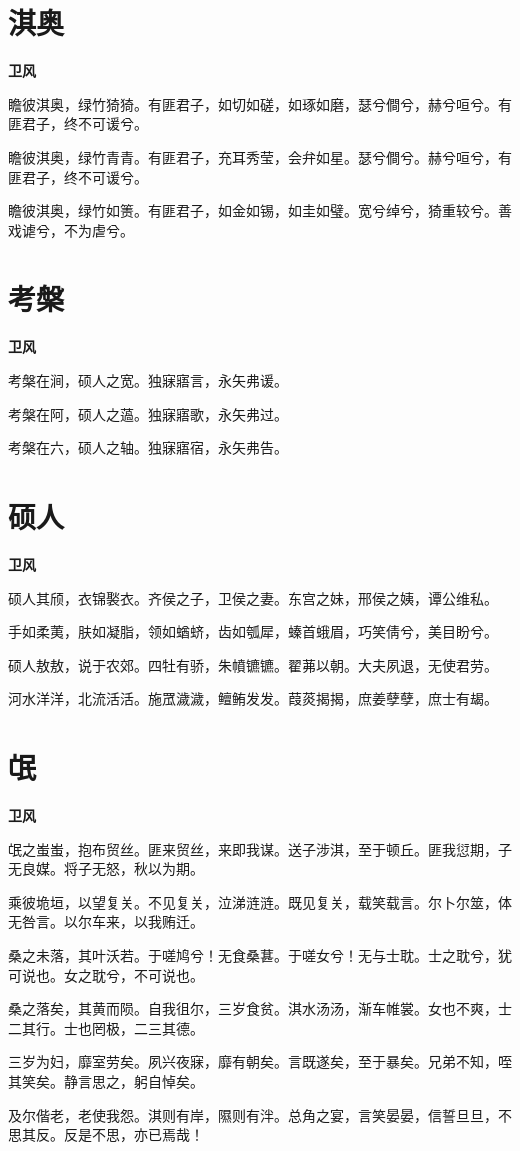 \documentclass[12pt,a4paper]{ctexbook}
\begin{document}
\section{淇奥}
\textbf{卫风}\par\vspace{0.5em}
瞻彼淇奥，绿竹猗猗。有匪君子，如切如磋，如琢如磨，瑟兮僴兮，赫兮咺兮。有匪君子，终不可谖兮。\par
瞻彼淇奥，绿竹青青。有匪君子，充耳秀莹，会弁如星。瑟兮僴兮。赫兮咺兮，有匪君子，终不可谖兮。\par
瞻彼淇奥，绿竹如箦。有匪君子，如金如锡，如圭如璧。宽兮绰兮，猗重较兮。善戏谑兮，不为虐兮。\par

\section{考槃}
\textbf{卫风}\par\vspace{0.5em}
考槃在涧，硕人之宽。独寐寤言，永矢弗谖。\par
考槃在阿，硕人之薖。独寐寤歌，永矢弗过。\par
考槃在六，硕人之轴。独寐寤宿，永矢弗告。\par

\section{硕人}
\textbf{卫风}\par\vspace{0.5em}
硕人其颀，衣锦褧衣。齐侯之子，卫侯之妻。东宫之妹，邢侯之姨，谭公维私。\par
手如柔荑，肤如凝脂，领如蝤蛴，齿如瓠犀，螓首蛾眉，巧笑倩兮，美目盼兮。\par
硕人敖敖，说于农郊。四牡有骄，朱幩镳镳。翟茀以朝。大夫夙退，无使君劳。\par
河水洋洋，北流活活。施罛濊濊，鳣鲔发发。葭菼揭揭，庶姜孽孽，庶士有朅。\par

\section{氓}
\textbf{卫风}\par\vspace{0.5em}
氓之蚩蚩，抱布贸丝。匪来贸丝，来即我谋。送子涉淇，至于顿丘。匪我愆期，子无良媒。将子无怒，秋以为期。\par
乘彼垝垣，以望复关。不见复关，泣涕涟涟。既见复关，载笑载言。尔卜尔筮，体无咎言。以尔车来，以我贿迁。\par
桑之未落，其叶沃若。于嗟鸠兮！无食桑葚。于嗟女兮！无与士耽。士之耽兮，犹可说也。女之耽兮，不可说也。\par
桑之落矣，其黄而陨。自我徂尔，三岁食贫。淇水汤汤，渐车帷裳。女也不爽，士二其行。士也罔极，二三其德。\par
三岁为妇，靡室劳矣。夙兴夜寐，靡有朝矣。言既遂矣，至于暴矣。兄弟不知，咥其笑矣。静言思之，躬自悼矣。\par
及尔偕老，老使我怨。淇则有岸，隰则有泮。总角之宴，言笑晏晏，信誓旦旦，不思其反。反是不思，亦已焉哉！\par
\end{document}
